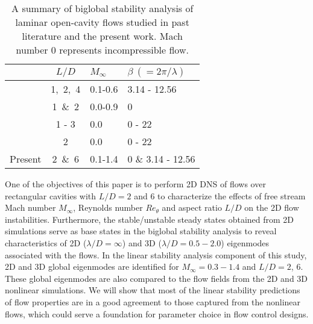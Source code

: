 \documentclass{jfm}
\begin{document}
\begin{table}
\begin{center}
\begin{tabular}{l c M{1in}M{1in}}
					&$L/D$	&$M_\infty$			&$\beta ~(=2\pi/\lambda)$	\\ \hline
\cite{Bres:JFM08}		& 1,~2,~4	&0.1-0.6				&3.14 - 12.56		\\ 
\cite{Yamouni:JFM13}	& 1~\&~2	&0.0-0.9				&0				\\ 
\cite{Garrido:JFM14}		& 1 - 3	&0.0			 		&0 - 22			\\ 
\cite{Vicente:JFM14}		& 2		&0.0					&0 - 22			\\
Present				&2~\&~6	&0.1-1.4				&0 \& 3.14 - 12.56
\end{tabular}
\end{center}
\caption{A summary of biglobal stability analysis of laminar open-cavity flows studied in past literature and the present work. Mach number 0 represents incompressible flow.}
\label{tab:sum}
\end{table}

One of the objectives of this paper is to perform 2D DNS of flows over rectangular cavities with $L/D=2$ and 6 to characterize the effects of free stream Mach number $M_\infty$, Reynolds number $Re_\theta$ and aspect ratio $L/D$ on the 2D flow instabilities. Furthermore, the stable/unstable steady states obtained from 2D simulations serve as base states in the biglobal stability analysis to reveal characteristics of 2D ($\lambda/D=\infty$) and 3D ($\lambda/D=0.5 -2.0$) eigenmodes associated with the flows. In the linear stability analysis component of this study, 2D and 3D global eigenmodes are identified for $M_\infty=0.3-1.4$ and $L/D=2$, 6. These global eigenmodes are also compared to the flow fields from the 2D and 3D nonlinear simulations. We will show that most of the linear stability predictions of flow properties are in a good agreement to those captured from the nonlinear flows, which could serve a foundation for parameter choice in flow control designs. 
\end{document}
